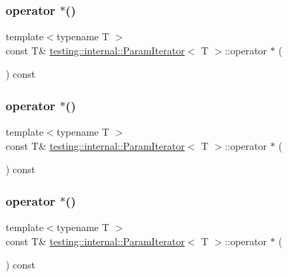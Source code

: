 \subsubsection{\texorpdfstring{operator $\ast$()}{operator *()}\hspace{0.1cm}{\footnotesize\ttfamily [1/3]}}
{\footnotesize\ttfamily template$<$typename T $>$ \\
const T\& \mbox{\hyperlink{classtesting_1_1internal_1_1_param_iterator}{testing\+::internal\+::\+Param\+Iterator}}$<$ T $>$\+::operator $\ast$ (\begin{DoxyParamCaption}{ }\end{DoxyParamCaption}) const\hspace{0.3cm}{\ttfamily [inline]}}

\mbox{\label{classtesting_1_1internal_1_1_param_iterator_aa024380a4cc0cfdcaa114e942c348fce}} 
\subsubsection{\texorpdfstring{operator $\ast$()}{operator *()}\hspace{0.1cm}{\footnotesize\ttfamily [2/3]}}
{\footnotesize\ttfamily template$<$typename T $>$ \\
const T\& \mbox{\hyperlink{classtesting_1_1internal_1_1_param_iterator}{testing\+::internal\+::\+Param\+Iterator}}$<$ T $>$\+::operator $\ast$ (\begin{DoxyParamCaption}{ }\end{DoxyParamCaption}) const\hspace{0.3cm}{\ttfamily [inline]}}

\mbox{\label{classtesting_1_1internal_1_1_param_iterator_aa024380a4cc0cfdcaa114e942c348fce}} 
\subsubsection{\texorpdfstring{operator $\ast$()}{operator *()}\hspace{0.1cm}{\footnotesize\ttfamily [3/3]}}
{\footnotesize\ttfamily template$<$typename T $>$ \\
const T\& \mbox{\hyperlink{classtesting_1_1internal_1_1_param_iterator}{testing\+::internal\+::\+Param\+Iterator}}$<$ T $>$\+::operator $\ast$ (\begin{DoxyParamCaption}{ }\end{DoxyParamCaption}) const\hspace{0.3cm}{\ttfamily [inline]}}

